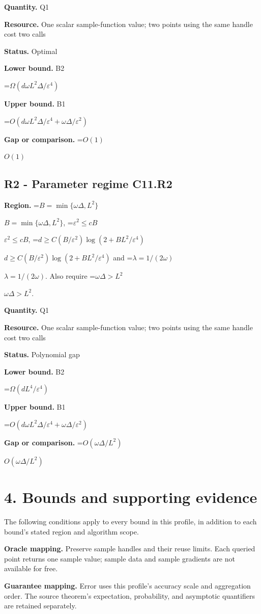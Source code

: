 \documentclass[10pt,a4paper]{article}
\newcommand{\AtlasMath}[1]{\par\begingroup\centering\setbox0=\hbox{$\displaystyle #1$}\ifdim\wd0>1.4\linewidth\typeout{ATLAS WIDE FORMULA: \the\wd0}\fi\ifdim\wd0>\linewidth\resizebox{\linewidth}{!}{\box0}\else\box0\fi\par\endgroup}
\newcommand{\AtlasInlineMath}[1]{\begingroup\setbox0=\hbox{$#1$}\ifdim\wd0>.4\linewidth\endgroup\AtlasMath{#1}\else\endgroup$#1$\fi}
\begin{document}
\textbf{Quantity.} Q1

\textbf{Resource.} One scalar sample-function value; two points using the same handle cost two calls

\textbf{Status.} Optimal

\textbf{Lower bound.} B2

\AtlasMath{\Omega(d\omega L^2\Delta/\varepsilon^4)}
\textbf{Upper bound.} B1

\AtlasMath{O(d\omega L^2\Delta/\varepsilon^4+\omega\Delta/\varepsilon^2)}
\textbf{Gap or comparison.} \AtlasInlineMath{O(1)}

\subsection{R2 - Parameter regime C11.R2}
\textbf{Region.} \AtlasInlineMath{B=\min\{\omega\Delta,L^2\}}, \AtlasInlineMath{\varepsilon^2\le cB}, \AtlasInlineMath{d\ge C(B/\varepsilon^2)\log(2+BL^2/\varepsilon^4)} and \AtlasInlineMath{\lambda=1/(2\omega)}. Also require \AtlasInlineMath{\omega\Delta> L^2}.

\textbf{Quantity.} Q1

\textbf{Resource.} One scalar sample-function value; two points using the same handle cost two calls

\textbf{Status.} Polynomial gap

\textbf{Lower bound.} B2

\AtlasMath{\Omega(dL^4/\varepsilon^4)}
\textbf{Upper bound.} B1

\AtlasMath{O(d\omega L^2\Delta/\varepsilon^4+\omega\Delta/\varepsilon^2)}
\textbf{Gap or comparison.} \AtlasInlineMath{O(\omega\Delta/L^2)}

\section{4. Bounds and supporting evidence}
The following conditions apply to every bound in this profile, in addition to each bound's stated region and algorithm scope.

\textbf{Oracle mapping.} Preserve sample handles and their reuse limits. Each queried point returns one sample value; sample data and sample gradients are not available for free.

\textbf{Guarantee mapping.} Error uses this profile's accuracy scale and aggregation order. The source theorem's expectation, probability, and asymptotic quantifiers are retained separately.
\end{document}
